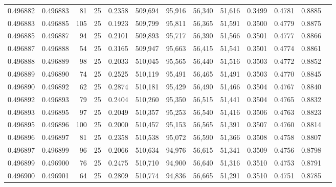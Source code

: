 \begin{tabular}{rrrrrrrrrrrrr}
0.496882 & 0.496883 &    81 &  25 &                                     0.2358 & 509,694 &  95,916 &  56,340 &  51,616 & 0.3499 & 0.4781 & 0.8885 \\
0.496883 & 0.496885 &   105 &  25 &                                     0.1923 & 509,799 &  95,811 &  56,365 &  51,591 & 0.3500 & 0.4779 & 0.8875 \\
0.496885 & 0.496887 &    94 &  25 &                                     0.2101 & 509,893 &  95,717 &  56,390 &  51,566 & 0.3501 & 0.4777 & 0.8866 \\
0.496887 & 0.496888 &    54 &  25 &                                     0.3165 & 509,947 &  95,663 &  56,415 &  51,541 & 0.3501 & 0.4774 & 0.8861 \\
0.496888 & 0.496889 &    98 &  25 &                                     0.2033 & 510,045 &  95,565 &  56,440 &  51,516 & 0.3503 & 0.4772 & 0.8852 \\
0.496889 & 0.496890 &    74 &  25 &                                     0.2525 & 510,119 &  95,491 &  56,465 &  51,491 & 0.3503 & 0.4770 & 0.8845 \\
0.496890 & 0.496892 &    62 &  25 &                                     0.2874 & 510,181 &  95,429 &  56,490 &  51,466 & 0.3504 & 0.4767 & 0.8840 \\
0.496892 & 0.496893 &    79 &  25 &                                     0.2404 & 510,260 &  95,350 &  56,515 &  51,441 & 0.3504 & 0.4765 & 0.8832 \\
0.496893 & 0.496895 &    97 &  25 &                                     0.2049 & 510,357 &  95,253 &  56,540 &  51,416 & 0.3506 & 0.4763 & 0.8823 \\
0.496895 & 0.496896 &   100 &  25 &                                     0.2000 & 510,457 &  95,153 &  56,565 &  51,391 & 0.3507 & 0.4760 & 0.8814 \\
0.496896 & 0.496897 &    81 &  25 &                                     0.2358 & 510,538 &  95,072 &  56,590 &  51,366 & 0.3508 & 0.4758 & 0.8807 \\
0.496897 & 0.496899 &    96 &  25 &                                     0.2066 & 510,634 &  94,976 &  56,615 &  51,341 & 0.3509 & 0.4756 & 0.8798 \\
0.496899 & 0.496900 &    76 &  25 &                                     0.2475 & 510,710 &  94,900 &  56,640 &  51,316 & 0.3510 & 0.4753 & 0.8791 \\
0.496900 & 0.496901 &    64 &  25 &                                     0.2809 & 510,774 &  94,836 &  56,665 &  51,291 & 0.3510 & 0.4751 & 0.8785 \\

\end{tabular}
